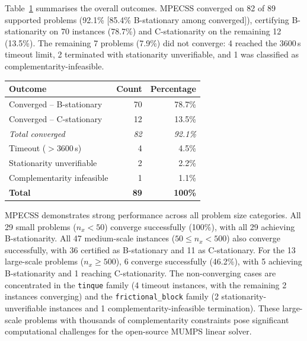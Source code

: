 Table~\ref{tab:mpeclib_summary} summarises the overall outcomes.
MPECSS converged on 82 of 89 supported problems (92.1\% [85.4\% B-stationary among converged]), certifying
B-stationarity on 70 instances (78.7\%) and C-stationarity on the
remaining 12 (13.5\%).  The remaining 7 problems (7.9\%) did not converge:
4 reached the 3600\,s timeout limit, 2 terminated with stationarity
unverifiable, and 1 was classified as complementarity-infeasible.

\begin{table}[!htb]
{\begin{tabular}{@{}lrr@{}}
\toprule
Outcome                          & Count & Percentage \\
\midrule
Converged -- B-stationary        & 70    & 78.7\%     \\
Converged -- C-stationary        & 12    & 13.5\%     \\
\textit{Total converged}         & \textit{82} & \textit{92.1\%} \\
\addlinespace
Timeout ($>$3600\,s)             & 4     & 4.5\%      \\
Stationarity unverifiable        & 2     & 2.2\%      \\
Complementarity infeasible       & 1     & 1.1\%      \\
\addlinespace
\textbf{Total}                   & \textbf{89} & \textbf{100\%} \\
\bottomrule
\end{tabular}}
\label{tab:mpeclib_summary}
\end{table}

MPECSS demonstrates strong performance across all problem size categories.
All 29 small problems ($n_x < 50$) converge successfully (100\%), with all 29 achieving B-stationarity.
All 47 medium-scale instances ($50 \leq n_x < 500$) also converge successfully, with 36 certified as B-stationary and 11 as C-stationary.
For the 13 large-scale problems ($n_x \geq 500$), 6 converge successfully (46.2\%), with 5 achieving B-stationarity and 1 reaching C-stationarity.
The non-converging cases are concentrated in the \texttt{tinque}
family (4 timeout instances, with the remaining 2
instances converging) and the \texttt{frictional\_block} family
(2 stationarity-unverifiable instances and 1 complementarity-infeasible
termination). These
large-scale problems with thousands of complementarity constraints
pose significant computational challenges for the open-source MUMPS linear solver.


